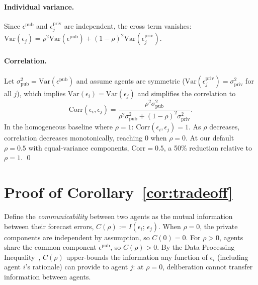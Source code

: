 \paragraph{Individual variance.}
Since $\epsilon^{\mathrm{pub}}$ and $\epsilon_j^{\mathrm{priv}}$ are independent, the cross term vanishes:
$\mathrm{Var}(\epsilon_j) = \rho^2 \mathrm{Var}(\epsilon^{\mathrm{pub}}) + (1{-}\rho)^2 \mathrm{Var}(\epsilon_j^{\mathrm{priv}})$.

\paragraph{Correlation.}
Let $\sigma_{\mathrm{pub}}^2 = \mathrm{Var}(\epsilon^{\mathrm{pub}})$ and assume agents are symmetric ($\mathrm{Var}(\epsilon_j^{\mathrm{priv}}) = \sigma_{\mathrm{priv}}^2$ for all $j$), which implies $\mathrm{Var}(\epsilon_i) = \mathrm{Var}(\epsilon_j)$ and simplifies the correlation to
\begin{equation}
\mathrm{Corr}(\epsilon_i, \epsilon_j)
  = \frac{\rho^2 \sigma_{\mathrm{pub}}^2}{\rho^2 \sigma_{\mathrm{pub}}^2 + (1{-}\rho)^2 \sigma_{\mathrm{priv}}^2}.
\end{equation}
In the homogeneous baseline where $\rho = 1$: $\mathrm{Corr}(\epsilon_i, \epsilon_j) = 1$.
As $\rho$ decreases, correlation decreases monotonically, reaching 0 when $\rho = 0$.
At our default $\rho = 0.5$ with equal-variance components, $\mathrm{Corr} = 0.5$, a 50\% reduction relative to $\rho = 1$. \qed

\section{Proof of Corollary~\ref{cor:tradeoff}}
\label{sec:appendix_corollary}

Define the \textit{communicability} between two agents as the mutual information between their forecast errors, $C(\rho) := I(\epsilon_i;\, \epsilon_j)$.
When $\rho = 0$, the private components are independent by assumption, so $C(0) = 0$.
For $\rho > 0$, agents share the common component $\epsilon^{\mathrm{pub}}$, so $C(\rho) > 0$.
By the Data Processing Inequality~\citep{shin2026reasoning}, $C(\rho)$ upper-bounds the information any function of $\epsilon_i$ (including agent $i$'s rationale) can provide to agent $j$: at $\rho = 0$, deliberation cannot transfer information between agents.

